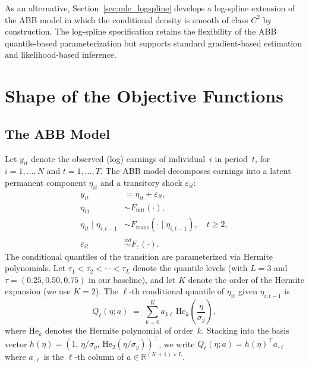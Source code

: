 \documentclass[12pt]{article}
\begin{document}
As an alternative, Section~\ref{sec:mle_logspline} develops a log-spline extension of the ABB model in which the conditional density is smooth of class $C^{2}$ by construction. The log-spline specification retains the flexibility of the ABB quantile-based parameterization but supports standard gradient-based estimation and likelihood-based inference.

\section{Shape of the Objective Functions}
\label{sec:shape}

\subsection{The ABB Model}

Let $y_{it}$ denote the observed (log) earnings of individual~$i$ in period~$t$, for $i=1,\dots,N$ and $t=1,\dots,T$. The ABB model decomposes earnings into a latent permanent component $\eta_{it}$ and a transitory shock $\varepsilon_{it}$:
\begin{align}
y_{it} &= \eta_{it} + \varepsilon_{it}, \\
\eta_{i1} &\sim F_{\mathrm{init}}(\cdot), \\
\eta_{it} \mid \eta_{i,t-1} &\sim F_{\mathrm{trans}}(\cdot \mid \eta_{i,t-1}), \quad t \geq 2, \\
\varepsilon_{it} &\stackrel{iid}{\sim} F_{\varepsilon}(\cdot).
\end{align}
The conditional quantiles of the transition are parameterized via Hermite polynomials. Let $\tau_{1} < \tau_{2} < \cdots < \tau_{L}$ denote the quantile levels (with $L=3$ and $\tau = (0.25, 0.50, 0.75)$ in our baseline), and let $K$ denote the order of the Hermite expansion (we use $K=2$). The $\ell$-th conditional quantile of $\eta_{it}$ given $\eta_{i,t-1}$ is
\begin{equation}
Q_{\ell}(\eta; a) \;=\; \sum_{k=0}^{K} a_{k\ell}\, \mathrm{He}_{k}\!\left(\frac{\eta}{\sigma_{y}}\right),
\label{eq:quantile}
\end{equation}
where $\mathrm{He}_{k}$ denotes the Hermite polynomial of order~$k$. Stacking into the basis vector
$h(\eta) = (1,\,\eta/\sigma_{y},\,\mathrm{He}_{2}(\eta/\sigma_{y}))^{\top}$,
we write $Q_{\ell}(\eta; a) = h(\eta)^{\top} a_{\cdot\ell}$ where $a_{\cdot\ell}$ is the $\ell$-th column of $a \in \mathbb{R}^{(K+1)\times L}$.
\end{document}
